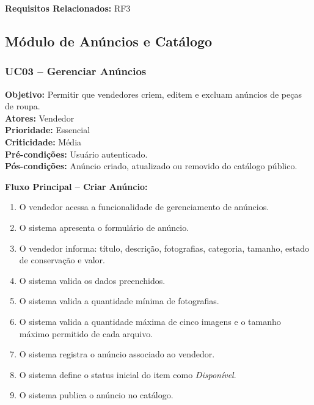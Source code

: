 ﻿\documentclass[12pt,a4paper]{article}
\begin{document}
\vspace{0.5em}
\noindent\textbf{Requisitos Relacionados:} RF3

\subsection{Módulo de Anúncios e Catálogo}

\subsubsection{UC03 – Gerenciar Anúncios}
\label{uc:03}
\noindent\textbf{Objetivo:} Permitir que vendedores criem, editem e excluam anúncios de peças de roupa.\\
\textbf{Atores:} Vendedor\\
\textbf{Prioridade:} Essencial\\
\textbf{Criticidade:} Média\\
\textbf{Pré-condições:} Usuário autenticado.\\
\textbf{Pós-condições:} Anúncio criado, atualizado ou removido do catálogo público.

\vspace{0.5em}
\noindent\textbf{Fluxo Principal – Criar Anúncio:}
\begin{enumerate}[label=\arabic*.]
    \item O vendedor acessa a funcionalidade de gerenciamento de anúncios.
    \item O sistema apresenta o formulário de anúncio.
    \item O vendedor informa: título, descrição, fotografias, categoria, tamanho, estado de conservação e valor.
    \item O sistema valida os dados preenchidos.
    \item O sistema valida a quantidade mínima de fotografias.
    \item O sistema valida a quantidade máxima de cinco imagens e o tamanho máximo permitido de cada arquivo.
    \item O sistema registra o anúncio associado ao vendedor.
    \item O sistema define o status inicial do item como \textit{Disponível}.
    \item O sistema publica o anúncio no catálogo.
\end{enumerate}
\end{document}
